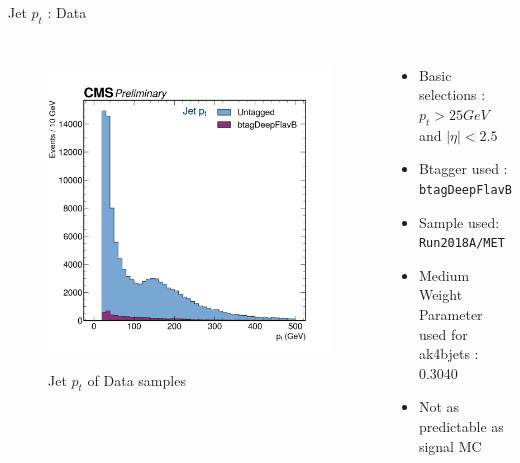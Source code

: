 \documentclass[10pt,xcolor=dvipsnames]{beamer}
\begin{document}
    
   \begin{frame}[fragile]{Jet $p_t$ : Data} 
    \begin{columns}
    \begin{figure} 
    \centering 
     \includegraphics[width=1\textwidth]{../Archive/KinemPlots/JetsData.png }
    \label{JetData} 
    \caption{Jet $p_t$ of Data samples}
    \end{figure} 
    \begin{itemize} 
    \raggedright 
    \small
    \item Basic selections : $p_t > 25 GeV $ and $|\eta | < 2.5 $
    \item {Btagger used : \texttt{btagDeepFlavB}} 
    \item {Sample used: \texttt{Run2018A/MET}} 
    \item Medium Weight Parameter used for ak4bjets : 0.3040
    \item Not as predictable as signal MC 
    \end{itemize}
    \end{columns} 
    \end{frame} 
    
\end{document}
